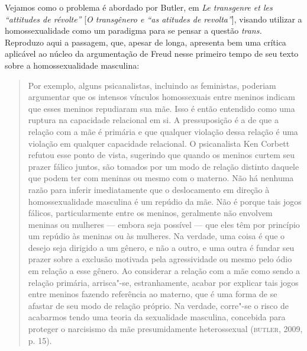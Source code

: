 Vejamos como o problema é abordado por Butler, em \emph{Le transgenre et les
``attitudes de révolte''} {[}\emph{O transgênero e ``as atitudes de
revolta''}{]}, visando utilizar a homossexualidade como um paradigma para
se pensar a questão \emph{trans.} Reproduzo aqui a passagem, que, apesar
de longa, apresenta bem uma crítica aplicável ao núcleo da argumentação
de Freud nesse primeiro tempo de seu texto sobre a homossexualidade
masculina:

\begin{quote}
Por exemplo, alguns psicanalistas, incluindo as feministas, poderiam
argumentar que os intensos vínculos homossexuais entre meninos indicam
que esses meninos repudiaram sua mãe. Isso é então entendido como uma
ruptura na capacidade relacional em si. A pressuposição é a de que a
relação com a mãe é primária e que qualquer violação dessa relação é uma
violação em qualquer capacidade relacional. O psicanalista Ken Corbett
refutou esse ponto de vista, sugerindo que quando os meninos curtem seu
prazer fálico juntos, são tomados por um modo de relação distinto
daquele que podem ter com meninas ou mesmo com o materno. Não há nenhuma
razão para inferir imediatamente que o deslocamento em direção à
homossexualidade masculina é um repúdio da mãe. Não é porque tais jogos
fálicos, particularmente entre os meninos, geralmente não envolvem
meninas ou mulheres --- embora seja possível --- que eles têm por
princípio um repúdio às meninas ou às mulheres. Na verdade, uma coisa é
que o desejo seja dirigido a um gênero, e não a outro, e uma outra é
fundar seu prazer sobre a exclusão motivada pela agressividade ou mesmo
pelo ódio em relação a esse gênero. Ao considerar a relação com a mãe
como sendo a relação primária, arrisca"-se, estranhamente, acabar por
explicar tais jogos entre meninos fazendo referência ao materno, que é
uma forma de se afastar de seu modo de relação próprio. Na verdade,
corre"-se o risco de acabarmos tendo uma teoria da sexualidade masculina,
concebida para proteger o narcisismo da mãe presumidamente
heterossexual (\textsc{butler}, 2009, p. 15).
\end{quote}

